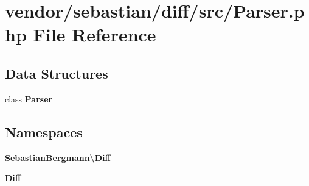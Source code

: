 \section{vendor/sebastian/diff/src/\+Parser.php File Reference}
\label{sebastian_2diff_2src_2_parser_8php}
\subsection*{Data Structures}
\begin{DoxyCompactItemize}
\item 
class {\bf Parser}
\end{DoxyCompactItemize}
\subsection*{Namespaces}
\begin{DoxyCompactItemize}
\item 
 {\bf Sebastian\+Bergmann\textbackslash{}\+Diff}
\item 
 {\bf Diff}
\end{DoxyCompactItemize}
